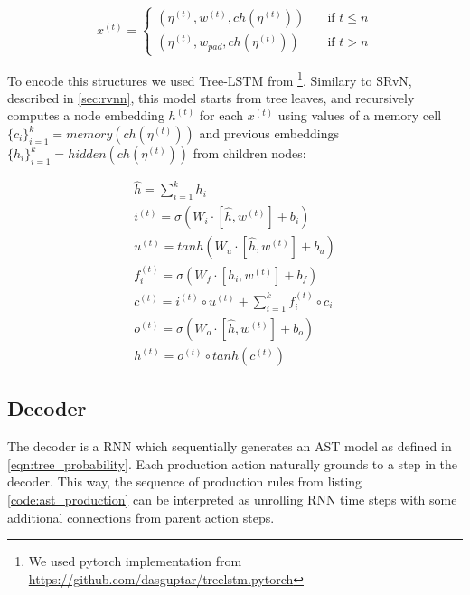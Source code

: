 \begin{equation}
 x^{(t)} =
  \begin{cases}
    (\eta^{(t)}, w^{(t)}, ch(\eta^{(t)}))  & \quad \text{if } t\leq n\\
    (\eta^{(t)}, w_{pad}, ch(\eta^{(t)}))  & \quad \text{if } t > n
  \end{cases}
\label{eq:enc_input}
\end{equation}

To encode this structures we used Tree-LSTM from \cite{Tai2015}\footnote{We used pytorch implementation from \href{https://github.com/dasguptar/treelstm.pytorch}{https://github.com/dasguptar/treelstm.pytorch}}. Similary to SRvN, described in \cref{sec:rvnn}, this model starts from tree leaves, and recursively computes a node embedding $h^{(t)}$ for each $x^{(t)}$ using values of a memory cell $\{c_i\}^{k}_{i=1} = memory(ch(\eta^{(t)}))$ and previous  embeddings $\{h_i\}^{k}_{i=1} = hidden(ch(\eta^{(t)}))$ from children nodes:

\begin{equation}
\begin{gathered}
    \hat{h} = \sum^{k}_{i=1}h_i \\
    
    i^{(t)} = \sigma(W_i\cdot[\hat{h}, w^{(t)}]+b_i) \\
    
    u^{(t)} = tanh(W_u\cdot[\hat{h}, w^{(t)}]+b_u) \\
    
    f^{(t)}_i = \sigma(W_{f}\cdot [h_i, w^{(t)}] + b_f) \\
    
    c^{(t)} = i^{(t)} \circ u^{(t)} + \sum_{i=1}^{k} f^{(t)}_i \circ c_i \\
    
    o^{(t)} = \sigma(W_o\cdot[\hat{h}, w^{(t)}]+b_o) \\
    
    h^{(t)} = o^{(t)} \circ tanh(c^{(t)})

\end{gathered}
\label{eq:tree_lstm}
\end{equation}

\subsection{Decoder}
The decoder is a RNN which sequentially generates an AST model as defined in \cref{eqn:tree_probability}. Each production action naturally grounds to a step in the decoder. This way, the sequence of production rules from listing \ref{code:ast_production} can be interpreted as unrolling RNN time steps with some additional connections from parent action steps.

